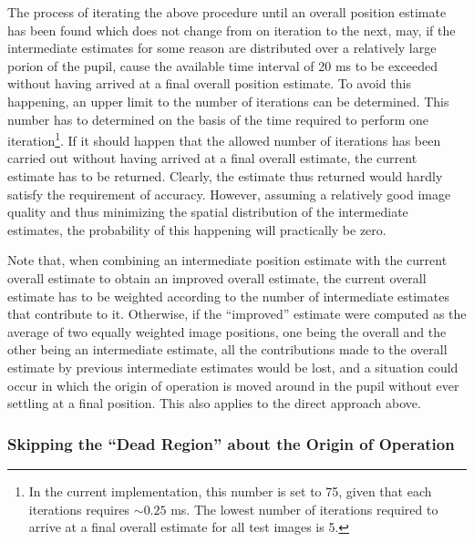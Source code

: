 The process of iterating the above procedure until an overall position
estimate has been found which does not change from on iteration to the
next, may, if the intermediate estimates for some reason are
distributed over a relatively large porion of the pupil, cause the
available time interval of 20 ms to be exceeded without having arrived
at a final overall position estimate.  To avoid this happening, an
upper limit to the number of iterations can be determined.  This
number has to determined on the basis of the time required to perform
one iteration\footnote{In the current implementation, this number is
  set to 75, given that each iterations requires $\sim 0.25$ ms.  The
  lowest number of iterations required to arrive at a final overall
  estimate for all test images is 5.}.  If it should happen that the
allowed number of iterations has been carried out without having
arrived at a final overall estimate, the current estimate has to be
returned.  Clearly, the estimate thus returned would hardly satisfy
the requirement of accuracy.  However, assuming a relatively good
image quality and thus minimizing the spatial distribution of the
intermediate estimates, the probability of this happening will
practically be zero.

Note that, when combining an intermediate position estimate with the
current overall estimate to obtain an improved overall estimate, the
current overall estimate has to be weighted according to the number of
intermediate estimates that contribute to it.  Otherwise, if the
``improved'' estimate were computed as the average of two equally
weighted image positions, one being the overall and the other being an
intermediate estimate, all the contributions made to the overall
estimate by previous intermediate estimates would be lost, and a
situation could occur in which the origin of operation is moved around
in the pupil without ever settling at a final position.  This also
applies to the direct approach above.

\subsubsection{Skipping the ``Dead Region'' about the Origin of
  Operation}

